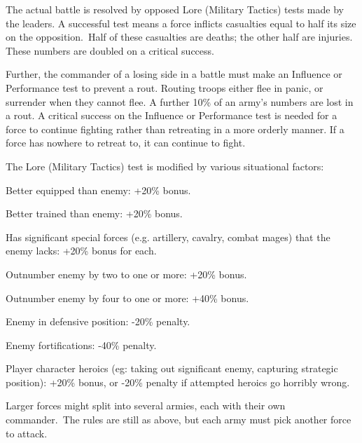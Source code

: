 The actual battle is resolved by opposed Lore (Military Tactics) tests made by the leaders. A successful test means a force inflicts casualties equal to half its size on the opposition. Half of these casualties are deaths; the other half are injuries. These numbers are doubled on a critical success.

Further, the commander of a losing side in a battle must make an Influence or Performance test to prevent a rout. Routing troops either flee in panic, or surrender when they cannot flee. A further 10\% of an army’s numbers are lost in a rout. A critical success on the Influence or Performance test is needed for a force to continue fighting rather than retreating in a more orderly manner. If a force has nowhere to retreat to, it can continue to fight.

The Lore (Military Tactics) test is modified by various situational factors:
\begin{rpg-list}
\item Better equipped than enemy: +20\% bonus.
\item Better trained than enemy: +20\% bonus.
\item Has significant special forces (e.g. artillery, cavalry, combat mages) that the enemy lacks: +20\% bonus for each.
\item Outnumber enemy by two to one or more: +20\% bonus.
\item Outnumber enemy by four to one or more: +40\% bonus.
\item Enemy in defensive position: -20\% penalty.
\item Enemy fortifications: -40\% penalty.
\item Player character heroics (eg: taking out significant enemy, capturing strategic position): +20\% bonus, or -20\% penalty if attempted heroics go horribly wrong.
\end{rpg-list}

Larger forces might split into several armies, each with their own commander. The rules are still as above, but each army must pick another force to attack.
